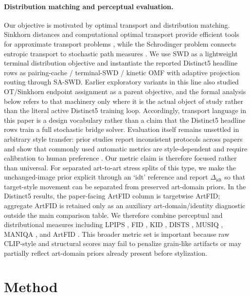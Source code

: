 \documentclass[letterpaper]{article}
\begin{document}
\paragraph{Distribution matching and perceptual evaluation.}
Our objective is motivated by optimal transport and distribution matching. Sinkhorn distances and computational optimal transport provide efficient tools for approximate transport problems \cite{cuturi2013sinkhorn,peyre2019computational}, while the Schrodinger problem connects entropic transport to stochastic path measures \cite{leonard2014survey}. We use SWD as a lightweight terminal distribution objective and instantiate the reported Distinct5 headline rows as pairing-cache / terminal-SWD / kinetic OMF with adaptive projection routing through SA-SWD. Earlier exploratory variants in this line also studied OT/Sinkhorn endpoint assignment as a parent objective, and the formal analysis below refers to that machinery only where it is the actual object of study rather than the literal active Distinct5 training loop. Accordingly, transport language in this paper is a design vocabulary rather than a claim that the Distinct5 headline rows train a full stochastic bridge solver. Evaluation itself remains unsettled in arbitrary style transfer: prior studies report inconsistent protocols across papers and show that commonly used automatic metrics are style-dependent and require calibration to human preference \cite{zhou2024comprehensiveeval,yeh2020calibrated,wright2022artfid}. Our metric claim is therefore focused rather than universal. For separated art-to-art stress splits of this type, we make the unchanged-image prior explicit through an `idt' reference and report $\Delta_{\mathrm{idt}}$ so that target-style movement can be separated from preserved art-domain priors. In the Distinct5 results, the paper-facing ArtFID column is targetwise ArtFID; aggregate ArtFID is retained only as an auxiliary art-domain/identity diagnostic outside the main comparison table. We therefore combine perceptual and distributional measures including LPIPS \cite{zhang2018lpips}, FID \cite{heusel2017fid}, KID \cite{binkowski2018kid}, DISTS \cite{ding2020dists}, MUSIQ \cite{ke2021musiq}, MANIQA \cite{yang2022maniqa}, and ArtFID \cite{wright2022artfid}. This broader metric set is important because raw CLIP-style and structural scores may fail to penalize grain-like artifacts or may partially reflect art-domain priors already present before stylization.

\section{Method}
\end{document}
